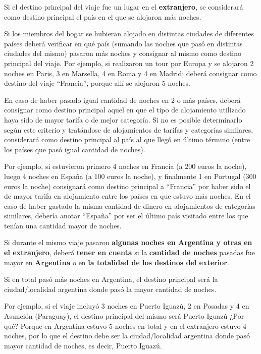 \documentclass[
  openany]{book}
\begin{document}
Si el destino principal del viaje fue un lugar en el \textbf{extranjero}, se considerará como destino principal el país en el que se alojaron más noches.

Si los miembros del hogar se hubieran alojado en distintas ciudades de diferentes países deberá verificar en qué país (sumando las noches que pasó en distintas ciudades del mismo) pasaron más noches y consignar al mismo como destino principal del viaje. Por ejemplo, si realizaron un tour por Europa y se alojaron 2 noches en Paris, 3 en Marsella, 4 en Roma y 4 en Madrid; deberá consignar como destino del viaje ``Francia'', porque allí se alojaron 5 noches.

En caso de haber pasado igual cantidad de noches en 2 o más países, deberá consignar como destino principal aquel en que el tipo de alojamiento utilizado haya sido de mayor tarifa o de mejor categoría. Si no es posible determinarlo según este criterio y tratándose de alojamientos de tarifas y categorías similares, considerará como destino principal al país al que llegó en último término (entre los países que pasó igual cantidad de noches).

Por ejemplo, si estuvieron primero 4 noches en Francia (a 200 euros la noche), luego 4 noches en España (a 100 euros la noche), y finalmente 1 en Portugal (300 euros la noche) consignará como destino principal a ``Francia'' por haber sido el de mayor tarifa en alojamiento entre los países en que estuvo más noches. En el caso de haber gastado la misma cantidad de dinero en alojamientos de categorías similares, debería anotar ``España'' por ser el último país visitado entre los que tenían una cantidad mayor de noches.

Si durante el mismo viaje pasaron \textbf{algunas noches en Argentina y otras en el extranjero}, deberá \textbf{tener en cuenta} si la \textbf{cantidad de noches} pasadas fue mayor en \textbf{Argentina} o en \textbf{la totalidad de los destinos del exterior}.

Si en total pasó más noches en Argentina, el destino principal será la ciudad/localidad argentina donde pasó la mayor cantidad de noches.

Por ejemplo, si el viaje incluyó 3 noches en Puerto Iguazú, 2 en Posadas y 4 en Asunción (Paraguay), el destino principal del mismo será Puerto Iguazú ¿Por qué? Porque en Argentina estuvo 5 noches en total y en el extranjero estuvo 4 noches, por lo que el destino debe ser la ciudad/localidad argentina donde pasó mayor cantidad de noches, es decir, Puerto Iguazú.
\end{document}
